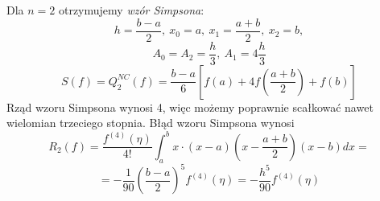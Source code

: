 \documentclass{article}
\begin{document}
Dla $n = 2$ otrzymujemy \emph{wzór Simpsona}:
\begin{equation*}
	h = \frac{b - a}{2}, \ x_0 = a, \ x_1 = \frac{a + b}{2}, \ x_2 = b,
\end{equation*}
\begin{equation*}
	A_0 = A_2 = \frac{h}{3}, \ A_1 = 4 \frac{h}{3}
\end{equation*}
\begin{equation}
	S(f) = Q_2^{NC}(f) = \frac{b - a}{6}[f(a) + 4f\left(\frac{a + b}{2}\right) + f(b)]
\end{equation}
Rząd wzoru Simpsona wynosi 4, więc możemy poprawnie scałkować nawet wielomian trzeciego stopnia.
Błąd wzoru Simpsona wynosi
\begin{equation*}
	R_2(f) = \frac{f^{(4)}(\eta)}{4!} \int_a^b x \cdot \left(x - a\right)\left(x - \frac{a+b}{2}\right)\left(x - b\right) dx =
\end{equation*}
\begin{equation*}
	= - \frac{1}{90} \left(\frac{b - a}{2} \right)^5 f^{(4)}(\eta) = - \frac{h^5}{90} f^{(4)}(\eta)
\end{equation*}
\end{document}
